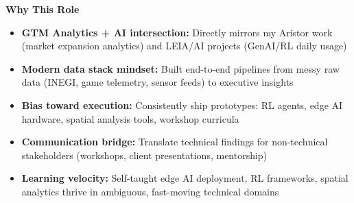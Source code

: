 \documentclass[11pt]{article}
\begin{document}
\vspace{12pt}

\begin{center}
    \textbf{Why This Role}
\end{center}
\begin{itemize}[noitemsep, topsep=0pt, partopsep=0pt, parsep=0pt]
    \item \textbf{GTM Analytics + AI intersection:} Directly mirrors my Aristor work (market expansion analytics) and LEIA/AI projects (GenAI/RL daily usage)
    \item \textbf{Modern data stack mindset:} Built end-to-end pipelines from messy raw data (INEGI, game telemetry, sensor feeds) to executive insights
    \item \textbf{Bias toward execution:} Consistently ship prototypes: RL agents, edge AI hardware, spatial analysis tools, workshop curricula
    \item \textbf{Communication bridge:} Translate technical findings for non-technical stakeholders (workshops, client presentations, mentorship)
    \item \textbf{Learning velocity:} Self-taught edge AI deployment, RL frameworks, spatial analytics thrive in ambiguous, fast-moving technical domains
\end{itemize}
\end{document}
